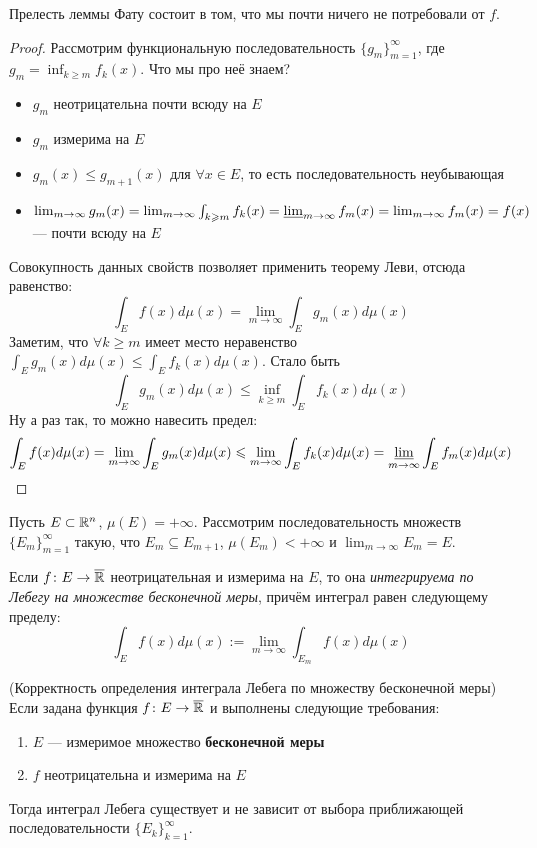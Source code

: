 \begin{note}
	Прелесть леммы Фату состоит в том, что мы почти ничего не потребовали от $f$.
\end{note}

\begin{proof}
	Рассмотрим функциональную последовательность $\{g_m\}_{m = 1}^\infty$, где $g_m = \inf_{k \ge m} f_k(x)$. Что мы про неё знаем?
	\begin{itemize}
		\item $g_m$ неотрицательна почти всюду на $E$
		
		\item $g_m$ измерима на $E$
		
		\item $g_m(x) \le g_{m + 1}(x)$ для $\forall x \in E$, то есть последовательность неубывающая
		
		\item $\lim_{m \to \infty} g_m(x) = \lim_{m \to \infty} \int_{k \ge m} f_k(x) = \varliminf_{m \to \infty} f_m(x) = \lim_{m \to \infty} f_m(x) = f(x)$ --- почти всюду на $E$
	\end{itemize}
	Совокупность данных свойств позволяет применить теорему Леви, отсюда равенство:
	\[
		\int_E f(x)d\mu(x) = \lim_{m \to \infty} \int_E g_m(x)d\mu(x)
	\]
	Заметим, что $\forall k \ge m$ имеет место неравенство $\int_E g_m(x)d\mu(x) \le \int_E f_k(x)d\mu(x)$. Стало быть
	\[
		\int_E g_m(x)d\mu(x) \le \inf_{k \ge m} \int_E f_k(x)d\mu(x)
	\]
	Ну а раз так, то можно навесить предел:
	\[
		\int_E f(x)d\mu(x) = \lim_{m \to \infty} \int_E g_m(x)d\mu(x) \le \lim_{m \to \infty} \int_E f_k(x)d\mu(x) = \varliminf_{m \to \infty} \int_E f_m(x)d\mu(x)
	\]
\end{proof}

\begin{definition}
	Пусть $E \subset \R^n$, $\mu(E) = +\infty$. Рассмотрим последовательность множеств $\{E_m\}_{m = 1}^\infty$ такую, что $E_m \subseteq E_{m + 1}$, $\mu(E_m) < +\infty$ и $\lim_{m \to \infty} E_m = E$.
	
	Если $f \colon E \to \ole{\R}$ неотрицательная и измерима на $E$, то она \textit{интегрируема по Лебегу на множестве бесконечной меры}, причём интеграл равен следующему пределу:
	\[
		\int_E f(x)d\mu(x) := \lim_{m \to \infty} \int_{E_m} f(x)d\mu(x)
	\]
\end{definition}

\begin{theorem} (Корректность определения интеграла Лебега по множеству бесконечной меры)
	Если задана функция $f \colon E \to \ole{\R}$ и выполнены следующие требования:
	\begin{enumerate}
		\item $E$ --- измеримое множество \textbf{бесконечной меры}
		
		\item $f$ неотрицательна и измерима на $E$
	\end{enumerate}
	Тогда интеграл Лебега существует и не зависит от выбора приближающей последовательности $\{E_k\}_{k = 1}^\infty$.
\end{theorem}

